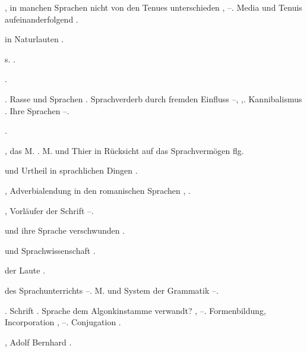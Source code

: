 \begin{register}
,  in manchen Sprachen nicht von den Tenues unterschieden \pageref{sp.188}, \pageref{sp.194}–\pageref{sp.195}. Media und Tenuis aufeinanderfolgend \pageref{sp.201}.


 in Naturlauten \pageref{sp.314}.

 s. .

 \pageref{sp.147}.

.  Rasse und Sprachen \pageref{sp.147}. Sprachverderb durch fremden Einfluss \pageref{sp.155}–\pageref{sp.166}, \pageref{sp.406},\pageref{sp.428}. Kannibalismus \pageref{sp.177}. Ihre Sprachen \pageref{sp.280}–\pageref{sp.283}.

 \pageref{sp.160}.

, das M. \pageref{sp.236}. M. und Thier in Rücksicht auf das Sprachvermögen \pageref{sp.303} flg.

 und Urtheil in sprachlichen Dingen \pageref{sp.47}.

,  Adverbialendung in den romanischen Sprachen \pageref{sp.316}, \pageref{sp.348}\sed{, \pageref{sp.437}}.

, Vorläufer der Schrift \pageref{sp.127}–\pageref{sp.128}.

 und ihre Sprache verschwunden \pageref{sp.146}.

 und Sprachwissenschaft \pageref{sp.14}.

 der Laute \pageref{sp.200}.

 des Sprachunterrichts \pageref{sp.71}–\pageref{sp.75}. M. und System der Grammatik \pageref{sp.109}–\pageref{sp.110}.

. Schrift \pageref{sp.130}. Sprache dem Algonkinstamme verwandt? \pageref{sp.147}, \sed{\pageref{sp.152},} \pageref{sp.162}–\pageref{sp.163}. Formenbildung, Incorporation \pageref{sp.328}, \pageref{sp.354}–\pageref{sp.357}.  Conjugation \pageref{sp.383}.

, Adolf Bernhard \pageref{sp.280}.




\end{register}
